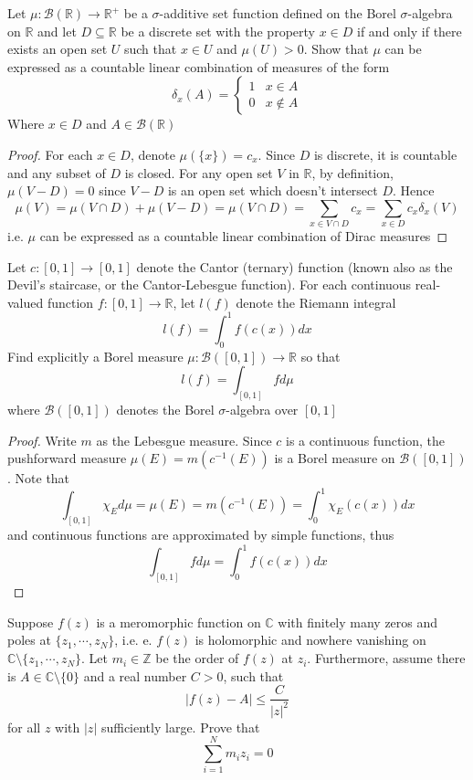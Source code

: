 \documentclass[main]{subfiles}
\begin{document}
\begin{exercise}
Let $\mu:\mathcal B(\mathbb R)\to\mathbb R^+$ be a $\sigma$-additive set function defined on the Borel $\sigma$-algebra on $\mathbb R$ and let $D\subseteq\mathbb R$ be a discrete set with the property $x\in D$ if and only if there exists an open set $U$ such that $x\in U$ and $\mu(U)>0$. Show that $\mu$ can be expressed as a countable linear combination of measures of the form
\[\delta_x(A)=\begin{cases}
1&x\in A \\
0&x\notin A
\end{cases}\]
Where $x\in D$ and $A\in\mathcal B(\mathbb R)$
\end{exercise}

\begin{proof}
For each $x\in D$, denote $\mu(\{x\})=c_x$. Since $D$ is discrete, it is countable and any subset of $D$ is closed. For any open set $V$ in $\mathbb R$, by definition, $\mu(V-D)=0$ since $V-D$ is an open set which doesn't intersect $D$. Hence
\[\mu(V)=\mu(V\cap D)+\mu(V-D)=\mu(V\cap D)=\sum_{x\in V\cap D}c_x=\sum_{x\in D}c_x\delta_x(V)\]
i.e. $\mu$ can be expressed as a countable linear combination of Dirac measures
\end{proof}

\begin{exercise}
Let $c:[0,1]\to[0,1]$ denote the Cantor (ternary) function (known also as the Devil’s staircase, or the Cantor-Lebesgue function). For each continuous real-valued function $f : [0, 1] \to \mathbb R$, let $l(f)$ denote the Riemann integral
\[l(f) = \int_0^1f(c(x))dx\]
Find explicitly a Borel measure $\mu : \mathcal B([0, 1]) \to\mathbb R$ so that
\[l(f)=\int_{[0,1]}fd\mu\]
where $\mathcal B([0, 1])$ denotes the Borel $\sigma$-algebra over $[0, 1]$
\end{exercise}

\begin{proof}
Write $m$ as the Lebesgue measure. Since $c$ is a continuous function, the pushforward measure $\mu(E)=m(c^{-1}(E))$ is a Borel measure on $\mathcal B([0,1])$. Note that
\[\int_{[0,1]}\chi_Ed\mu=\mu(E)=m(c^{-1}(E))=\int_0^1\chi_E(c(x))dx\]
and continuous functions are approximated by simple functions, thus
\[\int_{[0,1]}fd\mu=\int_0^1f(c(x))dx\]
\end{proof}

\begin{exercise}
Suppose $f(z)$ is a meromorphic function on $\mathbb C$ with finitely many zeros and poles at $\{z_1,\cdots,z_N\}$, i.e. e. $f(z)$ is holomorphic and nowhere vanishing on $\mathbb C \setminus\{z_1,\cdots, z_N \}$.  Let $m_i\in\mathbb Z$ be the order of $f(z)$ at $z_i$. Furthermore, assume there is $A \in \mathbb C \setminus \{0\}$ and a real number $C > 0$, such that
\[|f(z)-A|\leq\frac{C}{|z|^2}\]
for all $z$ with $|z|$ sufficiently large. Prove that
\[\sum_{i=1}^Nm_iz_i=0\]
\end{exercise}
\end{document}
